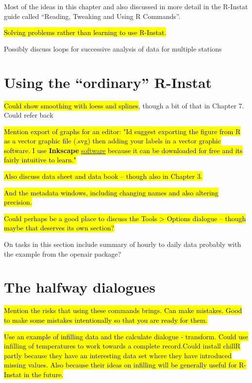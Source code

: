 \documentclass[
  letterpaper,
  DIV=11,
  numbers=noendperiod]{scrreprt}
\begin{document}
Most of the ideas in this chapter and also discussed in more detail in
the R-Instat guide called ``Reading, Tweaking and Using R Commands''.

\hl{Solving problems rather than learning to use R-Instat.}

Possibly discuss loops for successive analysis of data for multiple
stations

\section{Using the ``ordinary''
R-Instat}\label{using-the-ordinary-r-instat}

\hl{Could show smoothing with loess and splines}, though a bit of that
in Chapter 7. Could refer back

\hl{Mention export of graphs for an editor: "I\textquotesingle d suggest
exporting the figure from R as a vector graphic file (.svg) then adding
your labels in a vector graphic software. I use \textbf{Inkscape}
\href{https://inkscape.org/about/}{\ul{software}} because it can be
downloaded for free and its fairly intuitive to learn."}

\hl{Also discuss data sheet and data book -- though also in Chapter 3.}

\hl{And the metadata windows, including changing names and also altering
precision.}

\hl{Could perhaps be a good place to discuss the Tools \textgreater{}
Options dialogue -- though maybe that deserves its own section?}

On tasks in this section include summary of hourly to daily data
probably with the example from the openair package?

\section{The halfway dialogues}\label{the-halfway-dialogues}

\hl{Mention the risks that using these commands brings. Can make
mistakes. Good to make some mistakes intentionally so that you are ready
for them.}

\hl{Use an example of infilling data and the calculate dialogue -
transform. Could use infilling of temperatures to work towards a
complete record.Could install chillR partly because they have an
interesting data set where they have introduced missing values. Also
because their ideas on infilling will be generally useful for R-Instat
in the future.}
\end{document}

